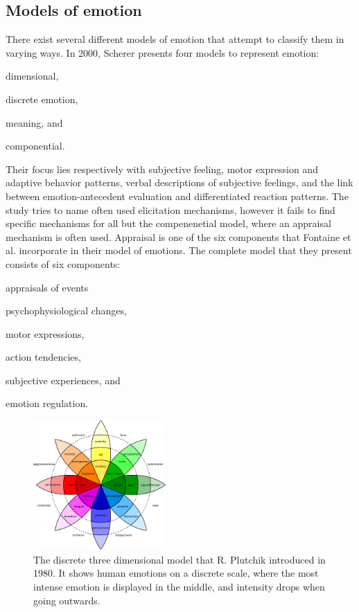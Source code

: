 \documentclass{sigchi}
\begin{document}
\subsection{Models of emotion} %
\label{sub:models_of_emotion}
There exist several different models of emotion that attempt to classify them in varying ways. In 2000, Scherer \cite{scherer2000} presents four models to represent emotion:
\begin{enumerate*}[label=(\alph*)]
  \item dimensional,
  \item discrete emotion,
  \item meaning, and
  \item componential.
\end{enumerate*}
Their focus lies respectively with subjective feeling, motor expression and adaptive behavior patterns, verbal descriptions of subjective feelings, and the link between emotion-antecedent evaluation and differentiated reaction patterns. The study tries to name often used elicitation mechanisms, however it fails to find specific mechanisms for all but the compenenetial model, where an appraisal mechanism is often used. Appraisal is one of the six components that Fontaine et al. \cite{Fontaine2007} incorporate in their model of emotions. The complete model that they present consists of six components:
\begin{enumerate*}[label=(\alph*)]
  \item appraisals of events
  \item psychophysiological changes,
  \item motor expressions,
  \item action tendencies,
  \item subjective experiences, and
  \item emotion regulation.
\end{enumerate*}

\begin{figure}[t]
    \centering
    \includegraphics[width=0.45\textwidth]{images/PlutchikWheelOfEmotions.eps}
    \caption{The discrete three dimensional model that R. Plutchik \protect\cite{Plutchik1980} introduced in 1980. It shows human emotions on a discrete scale, where the most intense emotion is displayed in the middle, and intensity drops when going outwards.}
    \label{fig:wheel_of_emotions}
\end{figure}
\end{document}
